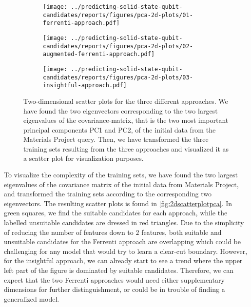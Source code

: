 \begin{figure}[!tbp]
    \centering
    \begin{subfigure}{0.5\textwidth}
        \centering
        \texttt{[image: ../predicting-solid-state-qubit-candidates/reports/figures/pca-2d-plots/01-ferrenti-approach.pdf]}
    \end{subfigure}%
    \begin{subfigure}{0.5\textwidth}
        \centering
        \texttt{[image: ../predicting-solid-state-qubit-candidates/reports/figures/pca-2d-plots/02-augmented-ferrenti-approach.pdf]}
    \end{subfigure}
    \begin{subfigure}{0.5\textwidth}
        \centering
        \texttt{[image: ../predicting-solid-state-qubit-candidates/reports/figures/pca-2d-plots/03-insightful-approach.pdf]}
    \end{subfigure}
    \vspace*{-95mm}
    \caption{Two-dimensional scatter plots for the three different approaches. We have found the two eigenvectors corresponding to the two largest eigenvalues of the covariance-matrix, that is the two most important principal components PC1 and PC2, of the initial data from the Materials Project query. Then, we have transformed the three training sets resulting from the three approaches and visualized it as a scatter plot for visualization purposes.}
    \label{fig:2dscatterplotpca}
\end{figure}

To visualize the complexity of the training sets, we have found the two largest eigenvalues of the covariance matrix of the initial data from Materials Project, and transformed the training sets according to the corresponding two eigenvectors. The resulting scatter plots is found in \autoref{fig:2dscatterplotpca}. In green squares, we find the suitable candidates for each approach, while the labelled unsuitable candidates are dressed in red triangles. Due to the simplicity of reducing the number of features down to $2$ features, both suitable and unsuitable candidates for the Ferrenti approach are overlapping which could be challenging for any model that would try to learn a clear-cut boundary. However, for the insightful approach, we can already start to see a trend where the upper left part of the figure is dominated by suitable candidates. Therefore, we can expect that the two Ferrenti approaches would need either supplementary dimensions for further distinguishment, or could be in trouble of finding a generalized model.


